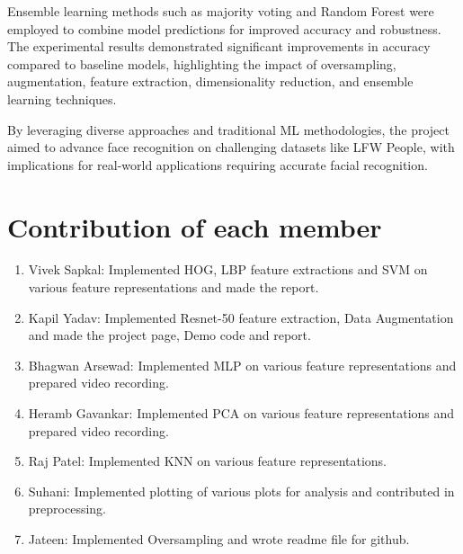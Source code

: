 \documentclass[a4paper]{article}
\theoremstyle{plain}
\theoremstyle{definition}
\begin{document}
Ensemble learning methods such as majority voting and Random Forest were employed to combine model predictions for improved accuracy and robustness. The experimental results demonstrated significant improvements in accuracy compared to baseline models, highlighting the impact of oversampling, augmentation, feature extraction, dimensionality reduction, and ensemble learning techniques.

By leveraging diverse approaches and traditional ML methodologies, the project aimed to advance face recognition on challenging datasets like LFW People, with implications for real-world applications requiring accurate facial recognition.
	
	
\cite{AnalyticaVidhya}
\cite{Medium_aricle}
\cite{Neural_network}
\cite{CNNResnet}

	\appendix
	
	\section{Contribution of each member}
	\label{sec:contribution}
	\begin{enumerate}
	\item Vivek Sapkal: Implemented HOG, LBP feature extractions and SVM on various feature representations and made the report.
	\item Kapil Yadav: Implemented Resnet-50 feature extraction, Data Augmentation and made the project page, Demo code and report.
 	\item Bhagwan Arsewad: Implemented MLP on various feature representations and prepared video recording.
	\item Heramb Gavankar: Implemented PCA on various feature representations and prepared video recording. 
	\item Raj Patel: Implemented KNN on various feature representations.
	\item Suhani: Implemented plotting of various plots for analysis and contributed in preprocessing.
	\item Jateen: Implemented Oversampling and wrote readme file for github.
	\end{enumerate}
    	
	
\end{document}
